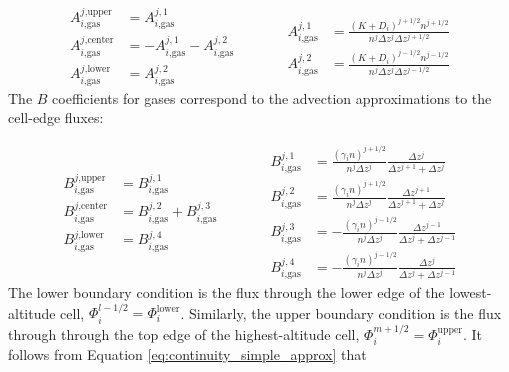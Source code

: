 \begin{equation*}
\begin{aligned}
  A_{i\text{,gas}}^{j\text{,upper}} &= A_{i\text{,gas}}^{j,1} \\
  A_{i\text{,gas}}^{j\text{,center}} &= - A_{i\text{,gas}}^{j,1} - A_{i\text{,gas}}^{j,2} \\
  A_{i\text{,gas}}^{j\text{,lower}} &= A_{i\text{,gas}}^{j,2}
\end{aligned}
\quad\quad\quad
\begin{aligned}
  A_{i\text{,gas}}^{j,1} &= \frac{(K + D_{i})^{j+1/2} n^{j+1/2}}{n^j \Delta z^j \Delta z^{j+1/2}} \\
  A_{i\text{,gas}}^{j,2} &= \frac{(K + D_{i})^{j-1/2} n^{j-1/2}}{n^j \Delta z^j \Delta z^{j-1/2}} 
\end{aligned}
\end{equation*}
The $B$ coefficients for gases correspond to the advection approximations to the cell-edge fluxes:

\begin{equation*}
\begin{aligned}
  B_{i\text{,gas}}^{j\text{,upper}} &= B_{i\text{,gas}}^{j,1} \\
  B_{i\text{,gas}}^{j\text{,center}} &= B_{i\text{,gas}}^{j,2} + B_{i\text{,gas}}^{j,3} \\
  B_{i\text{,gas}}^{j\text{,lower}} &= B_{i\text{,gas}}^{j,4}
\end{aligned}
\quad\quad\quad
\begin{aligned}
  B_{i\text{,gas}}^{j,1} &= \frac{(\gamma_{i} n)^{j+1/2}}{n^j \Delta z^j} \frac{\Delta z^{j}}{\Delta z^{j+1}+\Delta z^{j}} \\
  B_{i\text{,gas}}^{j,2} &= \frac{(\gamma_{i} n)^{j+1/2}}{n^j \Delta z^j} \frac{\Delta z^{j+1}}{\Delta z^{j+1}+\Delta z^{j}} \\
  B_{i\text{,gas}}^{j,3} &= - \frac{(\gamma_{i} n)^{j-1/2}}{n^j \Delta z^j} \frac{\Delta z^{j-1}}{\Delta z^{j}+\Delta z^{j-1}} \\
  B_{i\text{,gas}}^{j,4} &= - \frac{(\gamma_{i} n)^{j-1/2}}{n^j \Delta z^j} \frac{\Delta z^{j}}{\Delta z^{j}+\Delta z^{j-1}} 
\end{aligned}
\end{equation*}
The lower boundary condition is the flux through the lower edge of the lowest-altitude cell, $\Phi_{i}^{l-1/2} = \Phi_{i}^\text{lower}$. Similarly, the upper boundary condition is the flux through through the top edge of the highest-altitude cell, $\Phi_{i}^{m+1/2} = \Phi_{i}^\text{upper}$. It follows from Equation \eqref{eq:continuity_simple_approx} that

